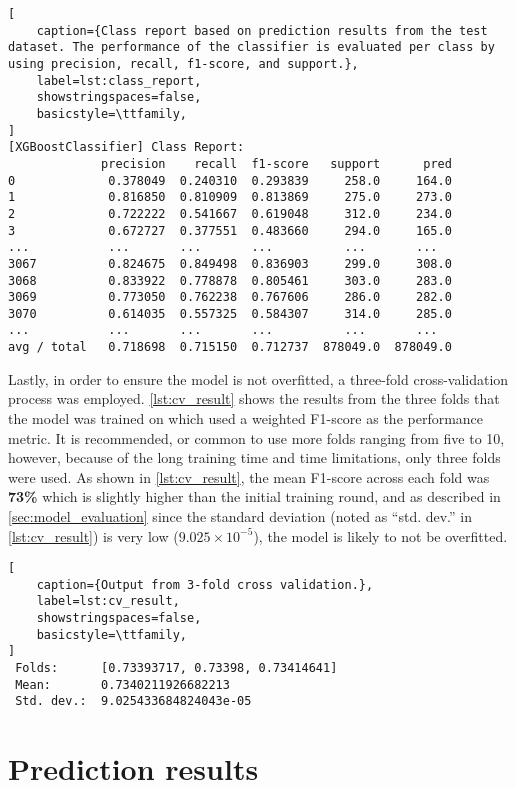 \begin{lstlisting}[
    caption={Class report based on prediction results from the test dataset. The performance of the classifier is evaluated per class by using precision, recall, f1-score, and support.},
    label=lst:class_report,
    showstringspaces=false,
    basicstyle=\ttfamily,
]
[XGBoostClassifier] Class Report:
             precision    recall  f1-score   support      pred
0             0.378049  0.240310  0.293839     258.0     164.0
1             0.816850  0.810909  0.813869     275.0     273.0
2             0.722222  0.541667  0.619048     312.0     234.0
3             0.672727  0.377551  0.483660     294.0     165.0
...           ...       ...       ...          ...       ...
3067          0.824675  0.849498  0.836903     299.0     308.0
3068          0.833922  0.778878  0.805461     303.0     283.0
3069          0.773050  0.762238  0.767606     286.0     282.0
3070          0.614035  0.557325  0.584307     314.0     285.0
...           ...       ...       ...          ...       ...
avg / total   0.718698  0.715150  0.712737  878049.0  878049.0

\end{lstlisting}

Lastly, in order to ensure the model is not overfitted, a three-fold cross-validation process was employed. \cref{lst:cv_result} shows the results from the three folds that the model was trained on which used a weighted F1-score as the performance metric. It is recommended, or common to use more folds ranging from five to 10, however, because of the long training time and time limitations, only three folds were used. As shown in \cref{lst:cv_result}, the mean F1-score across each fold was \textbf{73\%} which is slightly higher than the initial training round, and as described in \cref{sec:model_evaluation} since the standard deviation (noted as ``std. dev.'' in \cref{lst:cv_result}) is very low ($9.025 \times 10^{-5}$), the model is likely to not be overfitted.

\begin{lstlisting}[
    caption={Output from 3-fold cross validation.},
    label=lst:cv_result,
    showstringspaces=false,
    basicstyle=\ttfamily,
]
 Folds:      [0.73393717, 0.73398, 0.73414641]
 Mean:       0.7340211926682213
 Std. dev.:  9.025433684824043e-05
\end{lstlisting}

\section{Prediction results}

